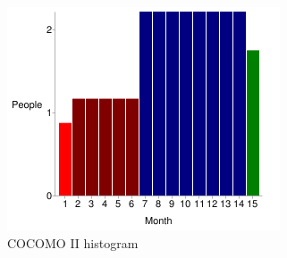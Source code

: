 \noindent \begin{center}
\begin{figure}[H]
\noindent \begin{centering}
\includegraphics{COCOMOII/images/real}
\par\end{centering}

\protect\caption{COCOMO II histogram}
\end{figure}

\par\end{center}
